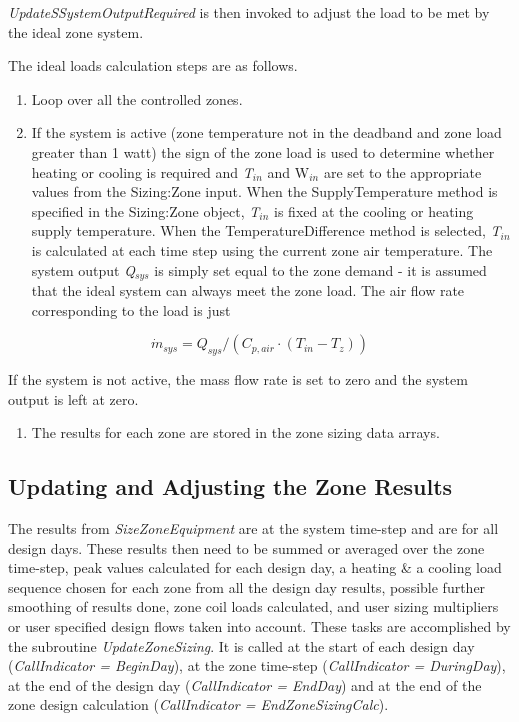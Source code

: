 \emph{UpdateSSystemOutputRequired} is then invoked to adjust the load to be met by the ideal zone system.

The ideal loads calculation steps are as follows.

\begin{enumerate}
\def\labelenumi{\arabic{enumi})}
\item
  Loop over all the controlled zones.
\item
  If the system is active (zone temperature not in the deadband and zone load greater than 1 watt) the sign of the zone load is used to determine whether heating or cooling is required and \emph{T\(_{in}\)} and W\emph{\(_{in}\)} are set to the appropriate values from the Sizing:Zone input. When the SupplyTemperature method is specified in the Sizing:Zone object, \emph{T\(_{in}\)} is fixed at the cooling or heating supply temperature. When the TemperatureDifference method is selected, \emph{T\(_{in}\)} is calculated at each time step using the current zone air temperature. The system output \emph{Q\(_{sys}\)} is simply set equal to the zone demand - it is assumed that the ideal system can always meet the zone load. The air flow rate corresponding to the load is just
\end{enumerate}

\begin{equation}
{\dot m_{sys}} = {Q_{sys}}/({C_{p,air}} \cdot ({T_{in}} - {T_z}))
\end{equation}

If the system is not active, the mass flow rate is set to zero and the system output is left at zero.

\begin{enumerate}
\def\labelenumi{\arabic{enumi})}
\setcounter{enumi}{2}
\tightlist
\item
  The results for each zone are stored in the zone sizing data arrays.
\end{enumerate}

\subsection{Updating and Adjusting the Zone Results}\label{updating-and-adjusting-the-zone-results}

The results from \emph{SizeZoneEquipment} are at the system time-step and are for all design days. These results then need to be summed or averaged over the zone time-step, peak values calculated for each design day, a heating \& a cooling load sequence chosen for each zone from all the design day results, possible further smoothing of results done, zone coil loads calculated, and user sizing multipliers or user specified design flows taken into account. These tasks are accomplished by the subroutine \emph{UpdateZoneSizing}. It is called at the start of each design day (\emph{CallIndicator = BeginDay}), at the zone time-step (\emph{CallIndicator = DuringDay}), at the end of the design day (\emph{CallIndicator = EndDay}) and at the end of the zone design calculation (\emph{CallIndicator = EndZoneSizingCalc}).


